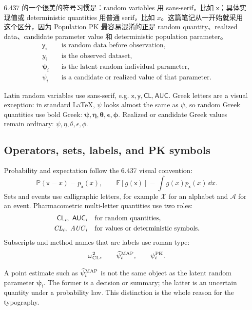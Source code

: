 \documentclass[a4paper]{article}
\newcommand{\rv}[1]{\mathsf{#1}}
\newcommand{\rpsi}{\boldsymbol{\psi}}
\newcommand{\reta}{\boldsymbol{\eta}}
\newcommand{\rtheta}{\boldsymbol{\theta}}
\newcommand{\repsilon}{\boldsymbol{\epsilon}}
\newcommand{\rphi}{\boldsymbol{\phi}}
\newcommand{\Prob}{\mathbb{P}}
\newcommand{\E}{\mathbb{E}}
\begin{document}
6.437 的一个很美的符号习惯是：random variables 用 sans-serif，比如 \(\rv{x}\)；具体实现值或 deterministic quantities 用普通 serif，比如 \(x\)。这篇笔记从一开始就采用这个区分，因为 Population PK 最容易混淆的正是 random quantity、realized data、candidate parameter value 和 deterministic population parameter。
\[
  \begin{aligned}
    \rv{y}_i &\quad \text{is random data before observation},\\
    y_i &\quad \text{is the observed dataset},\\
    \rpsi_i &\quad \text{is the latent random individual parameter},\\
    \psi_i &\quad \text{is a candidate or realized value of that parameter}.
  \end{aligned}
\]

\begin{notation}
  Latin random variables use sans-serif, e.g. \(\rv{x},\rv{y},\rv{CL},\rv{AUC}\). Greek letters are a visual exception: in standard LaTeX, \(\mathsf{\psi}\) looks almost the same as \(\psi\), so random Greek quantities use bold Greek: \(\rpsi,\reta,\rtheta,\repsilon,\rphi\). Realized or candidate Greek values remain ordinary: \(\psi,\eta,\theta,\epsilon,\phi\).
\end{notation}

\subsection{Operators, sets, labels, and PK symbols}

Probability and expectation follow the 6.437 visual convention:
\[
  \Prob(\rv{x}=x)=p_{\rv{x}}(x),
  \qquad
  \E[g(\rv{x})]=\int g(x)p_{\rv{x}}(x)\,\dd x.
\]
Sets and events use calligraphic letters, for example \(\mathcal{X}\) for an alphabet and \(\mathcal{A}\) for an event.  Pharmacometric multi-letter quantities use two roles:
\[
  \begin{aligned}
    \rv{CL}_i,\ \rv{AUC}_i
    &\quad \text{for random quantities},\\
    \pksym{CL}_i,\ \pksym{AUC}_i
    &\quad \text{for values or deterministic symbols}.
  \end{aligned}
\]
Subscripts and method names that are labels use roman type:
\[
  \omega_{\mathrm{CL}}^2,
  \qquad
  \widehat\psi_i^{\mathrm{MAP}},
  \qquad
  \psi_i^{\mathrm{PK}}.
\]

\begin{warning}
  A point estimate such as \(\widehat\psi_i^{\mathrm{MAP}}\) is not the same object as the latent random parameter \(\rpsi_i\).  The former is a decision or summary; the latter is an uncertain quantity under a probability law.  This distinction is the whole reason for the typography.
\end{warning}
\end{document}
